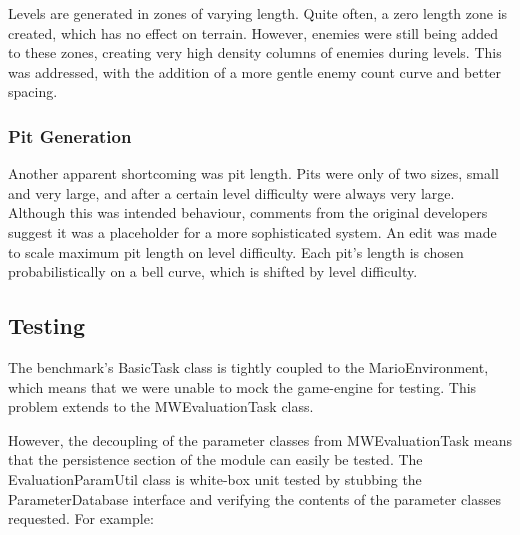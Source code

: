 Levels are generated in zones of varying length. Quite often, a zero length zone is created, which has no effect on terrain. However, enemies were still being added to these zones, creating very high density columns of enemies during levels. This was addressed, with the addition of a more gentle enemy count curve and better spacing.

\subsubsection{Pit Generation}

Another apparent shortcoming was pit length. Pits were only of two sizes, small and very large, and after a certain level difficulty were always very large. Although this was intended behaviour, comments from the original developers suggest it was a placeholder for a more sophisticated system. An edit was made to scale maximum pit length on level difficulty. Each pit's length is chosen probabilistically on a bell curve, which is shifted by level difficulty.



\subsection{Testing}

The benchmark's BasicTask class is tightly coupled to the MarioEnvironment, which means that we were unable to mock the game-engine for testing. This problem extends to the MWEvaluationTask class.

However, the decoupling of the parameter classes from MWEvaluationTask means that the persistence section of the module can easily be tested. The EvaluationParamUtil class is white-box unit tested by stubbing the ParameterDatabase interface and verifying the contents of the parameter classes requested. For example:

